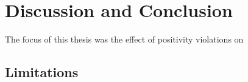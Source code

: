 \documentclass[11pt]{article}
\begin{document}
    \section{Discussion and Conclusion}\label{discussion-and-conclusion}

The focus of this thesis was the effect of positivity violations on

\subsection{Limitations}\label{limitations}


    
    



    
    
\end{document}
